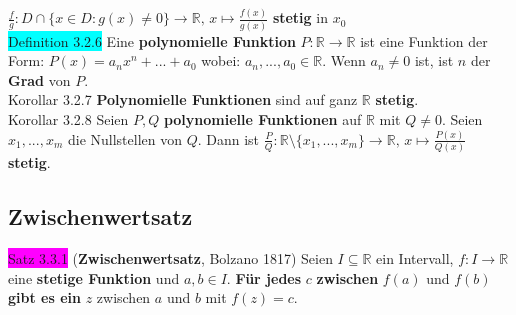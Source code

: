 \documentclass[landscape, 10pt]{article}
\newcommand{\R}{\mathbb{R}}
\begin{document}
\begin{multicols}{3}
                            \textcolor{NavyBlue}{
                            $\frac{f}{g}:D\cap\{x\in D:g(x)\neq0\}
                            \longrightarrow\R,\,
                            x\longmapsto\frac{f(x)}{g(x)}$} 
                            \textbf{stetig} in \textcolor{NavyBlue}{$x_0$}\\
              \colorbox{cyan}{Definition 3.2.6} 
                     Eine \textbf{polynomielle Funktion} 
                     \textcolor{NavyBlue}{$P:\R\longrightarrow\R$} 
                     ist eine Funktion 
                     der Form: \textcolor{NavyBlue}{$P(x)=a_nx^n+...+a_0$}
                     wobei: \textcolor{NavyBlue}{$a_n,...,a_0\in\R$}. 
                     Wenn \textcolor{NavyBlue}{$a_n\neq0$} ist, ist 
                     \textcolor{NavyBlue}{$n$} 
                     der \textbf{Grad} von \textcolor{NavyBlue}{$P$}.\\
              \colorbox{BurntOrange}{Korollar 3.2.7} 
                     \textbf{Polynomielle Funktionen} 
                     sind auf ganz $\R$ \textbf{stetig}.\\
              \colorbox{BurntOrange}{Korollar 3.2.8} 
                     Seien $P,Q$ \textbf{polynomielle Funktionen} 
                     auf $\R$ mit \textcolor{NavyBlue}{$Q\neq0$}. Seien 
                     \textcolor{NavyBlue}{$x_1,...,x_m$} die Nullstellen von 
                     \textcolor{NavyBlue}{$Q$}. 
                     Dann ist \textcolor{NavyBlue}{
                     $\frac{P}{Q}:\R\setminus\{x_1,...,x_m\}\longrightarrow\R,\,
                     x\longmapsto\frac{P(x)}{Q(x)}$} \textbf{stetig}.\\
       \subsection{Zwischenwertsatz}
              \colorbox{magenta}{Satz 3.3.1} (\textbf{Zwischenwertsatz}, Bolzano 1817) Seien 
                     \textcolor{NavyBlue}{$I\subseteq\R$} ein Intervall, 
                     \textcolor{NavyBlue}{$f:I\longrightarrow\R$} 
                     eine \textbf{stetige Funktion} und 
                     \textcolor{NavyBlue}{$a,b\in I$}. 
                     \textbf{Für jedes} \textcolor{NavyBlue}{$c$} \textbf{zwischen} 
                     \textcolor{NavyBlue}{$f(a)$} und \textcolor{NavyBlue}{$f(b)$} 
                     \textbf{gibt es ein} \textcolor{NavyBlue}{$z$} 
                     zwischen \textcolor{NavyBlue}{$a$} und \textcolor{NavyBlue}{$b$} mit 
                     \textcolor{NavyBlue}{$f(z)=c$}.

\end{multicols}
\end{document}
